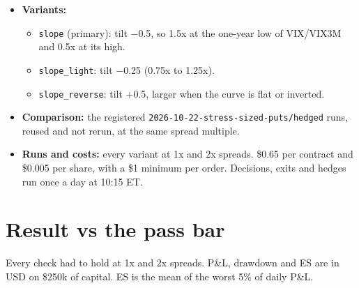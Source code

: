 \documentclass{article}
\begin{document}
\begin{itemize}
\begin{itemize}

\item p is the percentile of the prior close of VIX/\allowbreak{}VIX3M among its last 252 completed closes.

\item VIX/\allowbreak{}VIX3M below 1 is contango; above 1 is inverted.

\end{itemize}

\item \textbf{Variants:}

\begin{itemize}

\item \texttt{slope} (primary): tilt \ensuremath{-}0.5, so 1.5x at the one-year low of VIX/\allowbreak{}VIX3M and 0.5x at its high.

\item \texttt{slope\_\allowbreak{}light}: tilt \ensuremath{-}0.25 (0.75x to 1.25x).

\item \texttt{slope\_\allowbreak{}reverse}: tilt +0.5, larger when the curve is flat or inverted.

\end{itemize}

\item \textbf{Comparison:} the registered \texttt{2026-\allowbreak{}10-\allowbreak{}22-\allowbreak{}stress-\allowbreak{}sized-\allowbreak{}puts/\allowbreak{}hedged} runs, reused and not rerun, at the same spread multiple.

\item \textbf{Runs and costs:} every variant at 1x and 2x spreads. \$0.65 per contract and \$0.005 per share, with a \$1 minimum per order. Decisions, exits and hedges run once a day at 10:15 ET.

\end{itemize}

\section{Result vs the pass bar}

Every check had to hold at 1x and 2x spreads. P\&L, drawdown and ES are in USD on \$250k of capital. ES is the mean of the worst 5\% of daily P\&L.
\end{document}
